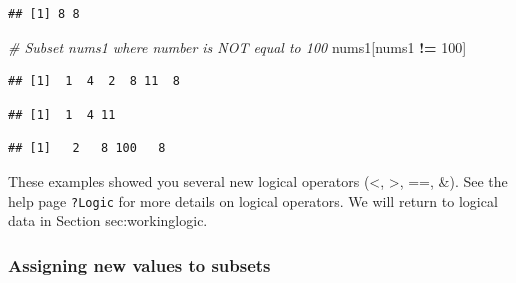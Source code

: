 \documentclass[]{book}
\newenvironment{Shaded}{\begin{snugshade}}{\end{snugshade}}
\newcommand{\CommentTok}[1]{\textcolor[rgb]{0.56,0.35,0.01}{\textit{#1}}}
\newcommand{\DecValTok}[1]{\textcolor[rgb]{0.00,0.00,0.81}{#1}}
\newcommand{\KeywordTok}[1]{\textcolor[rgb]{0.13,0.29,0.53}{\textbf{#1}}}
\newcommand{\NormalTok}[1]{#1}
\newcommand{\OperatorTok}[1]{\textcolor[rgb]{0.81,0.36,0.00}{\textbf{#1}}}
\newcommand{\StringTok}[1]{\textcolor[rgb]{0.31,0.60,0.02}{#1}}
\begin{document}
\begin{verbatim}
## [1] 8 8
\end{verbatim}

\begin{Shaded}
\begin{Highlighting}[]
\CommentTok{# Subset nums1 where number is NOT equal to 100}
\NormalTok{nums1[nums1 }\OperatorTok{!=}\StringTok{ }\DecValTok{100}\NormalTok{]}
\end{Highlighting}
\end{Shaded}

\begin{verbatim}
## [1]  1  4  2  8 11  8
\end{verbatim}

\begin{Shaded}
\end{Shaded}

\begin{verbatim}
## [1]  1  4 11
\end{verbatim}

\begin{Shaded}
\end{Shaded}

\begin{verbatim}
## [1]   2   8 100   8
\end{verbatim}

These examples showed you several new logical operators (\textless{}, \textgreater{}, ==, \&). See the help page \texttt{?Logic} for more details on logical operators. We will return to logical data in Section sec:workinglogic.

\hypertarget{assigning-new-values-to-subsets}{%
\subsubsection{Assigning new values to subsets}\label{assigning-new-values-to-subsets}}
\end{document}
